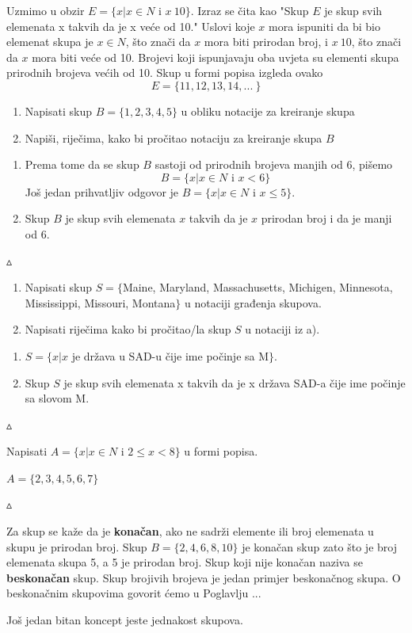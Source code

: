 \documentclass[a4paper,14pt,svgnames]{article}
\newcounter{counter}
\newcommand{\examplecounter}{\textbf{\refstepcounter{counter}PRIMJER \thecounter}}
\newcommand{\example}[3]{\begin{tcolorbox}[breakable,title=\large \examplecounter \hfill\small\textbf{"#1"},pad at break=1mm]
#2
\begin{tcolorbox}[breakable,title=\small \textbf{RJEŠENJE},colback=white,pad at break=1mm]
\begin{center}
#3

\vspace{0.5em}\hfill $\vartriangle$
\end{center}
\end{tcolorbox}
\end{tcolorbox}}
\begin{document}
Uzmimo u obzir $E=\{x|x\in N$ i $x\>10\}$. Izraz se čita kao "Skup $E$ je skup svih elemenata x takvih da je x veće od 10." Uslovi koje $x$ mora ispuniti da bi bio elemenat skupa je $x\in N$, što znači da $x$ mora biti prirodan broj, i $x\> 10$, što znači da $x$ mora biti veće od 10. Brojevi koji ispunjavaju oba uvjeta su elementi skupa prirodnih brojeva većih od 10. Skup u formi popisa izgleda ovako
$$E=\{11, 12, 13, 14, ...\ \}$$

\example{Korištenje notacije za kreiranje skupova}{\begin{enumerate}[label=\alph*),leftmargin=0.5cm]
\item Napisati skup $B=\{1, 2, 3, 4, 5\}$ u obliku notacije za kreiranje skupa
\item Napiši, riječima, kako bi pročitao notaciju za kreiranje skupa $B$
\end{enumerate}}{\begin{enumerate}[label=\alph*),leftmargin=0.5cm]
\item Prema tome da se skup $B$ sastoji od prirodnih brojeva manjih od 6, pišemo $$B=\{x|x\in N\text { i } x< 6\}$$ Još jedan prihvatljiv odgovor je $B=\{x|x\in N$ i $x\leqslant 5\}$.
\item Skup $B$ je skup svih elemenata $x$ takvih da je $x$ prirodan broj i da je manji od 6.
\end{enumerate}}\medskip

\example{Forma popisa u notaciji građenja skupova}{\begin{enumerate}[label=\alph*),leftmargin=0.5cm]
\item Napisati skup $S = \{$Maine, Maryland, Massachusetts, Michigen, Minnesota, Mississippi, Missouri, Montana$\}$ u notaciji građenja skupova.
\item Napisati riječima kako bi pročitao/la skup $S$ u notaciji iz a).
\end{enumerate}}{\begin{enumerate}[label=\alph*),leftmargin=0.5cm]
\item $S=\{x|x$ je država u SAD-u čije ime počinje sa M$\}$.
\item Skup $S$ je skup svih elemenata x takvih da je x država SAD-a čije ime počinje sa slovom M.
\end{enumerate}}\medskip

\example{Notacija građenja skupova u formi popisa}{Napisati $A=\{x|x\in N$ i $2\leqslant x<8\}$ u formi popisa.}{$A=\{2, 3, 4, 5, 6, 7\}$}\medskip

Za skup se kaže da je \textbf{konačan}, ako ne sadrži elemente ili broj elemenata u skupu je prirodan broj. Skup $B=\{2, 4, 6, 8, 10\}$ je konačan skup zato što je broj elemenata skupa 5, a 5 je prirodan broj. Skup koji nije konačan naziva se \textbf{beskonačan} skup. Skup brojivih brojeva je jedan primjer beskonačnog skupa. O beskonačnim skupovima govorit ćemo u Poglavlju ...\par\smallskip
Još jedan bitan koncept jeste jednakost skupova.\smallskip
\end{document}
